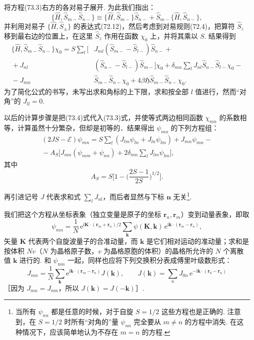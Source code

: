 将方程(73.3)右方的各对易子展开. 为此我们指出：
\begin{equation*}
\{\hat{H},\hat{S}_{m-}\hat{S}_{n-}\}\equiv
\{\hat{H},\hat{S}_{m-}\}\hat{S}_{n-}
+\hat{S}_{m-}\{\hat{H},\hat{S}_{n-}\},
\end{equation*}
并利用对易子 $\{\hat{H},\hat{S}_{\pm}\}$ 的表达式(72.12)，然后考虑到对易规则(72.4)，把算符 $\hat{S}_z$ 移到最右边的位置上，在这里 $\hat{S}_z$ 作用在函数 $\chi_0$ 上，并将其乘以 $S$. 结果得到
\begin{equation}
\begin{aligned}
\{\hat{H},\hat{S}_{m-}\hat{S}_{n-}\}\chi_0
=S\sum_l\bigl[&J_{ml}(\hat{S}_{m-}-\hat{S}_{l-})\hat{S}_{n-}+{}\\
{}+J_{nl}&(\hat{S}_{n-}-\hat{S}_{l-})\hat{S}_{m-}\bigr]\chi_0
+\delta_{mn}\sum_lJ_{nl}\hat{S}_{n-}\hat{S}_{l-}\chi_0-{}\\
{}-J_{mn}&\hat{S}_{m-}\hat{S}_{n-}\chi_0
+4\beta\mathfrak{H}\hat{S}_{m-}\hat{S}_{n-}\chi_0.
\end{aligned}
\end{equation}
为了简化公式的书写，未写出求和角标的上下限，求和按全部 $l$ 值进行，然而“对角”的 $J_{ll}=0$.

以后的计算步骤是把(73.4)式代入(73.3)式，并使等式两边相同函数 $\chi_{mn}$ 的系数相等，计算虽然十分繁杂，但却是初等的．结果得出 $\psi_{mn}$ 的下列方程组：
\begin{equation}
\begin{aligned}
(2JS-\mathcal{E})\psi_{mn}
=S\sum_l(J_{lm}\psi_{ln}+J_{ln}\psi_{lm})+J_{mn}\psi_{mn}-{}\\
{}-A_S\bigl[J_{mn}(\psi_{mm}+\psi_{nn})
+2\delta_{mn}\sum_lJ_{lm}\psi_{lm}\bigr],
\end{aligned}
\end{equation}
其中
\begin{equation*}
A_S=S\biggl[1-\biggl(\frac{2S-1}{2S}\biggr)^{\!1/2}\biggr].
\end{equation*}

再引进记号 $J$ 代表求和式 $\sum_lJ_{nl}$，而后者显然与下标 $\bm{n}$ 无关\footnote{当所有 $\psi_{nn}$ 都是任意的时候，对于自旋 $S=1/2$ 这些方程也是正确的. 注意到，在 $S=1/2$ 时所有“对角的”量 $\psi_{nn}$ 完全要从 $m\neq n$ 的方程中消失. 在这种情况下，应该简单地认为不存在 $m=n$ 的方程.}.

我们把这个方程从坐标表象（独立变量是原子的坐标 $\bm{r}_n,\bm{r}_m$）变到动量表象，即取
\begin{equation}
\psi_{mn}=\frac{1}{N}\,\mathrm{e}^{\mathrm{i}\bm{K}\cdot(\bm{r}_m+\bm{r}_n)/2}
\sum_{\bm{k}}\psi(\bm{K},\bm{k})\,\mathrm{e}^{\mathrm{i}\bm{k}\cdot(\bm{r}_m-\bm{r}_n)},
\end{equation}
矢量 $\bm{K}$ 代表两个自旋波量子的合准动量，而 $\bm{k}$ 是它们相对运动的准动量；求和是按体积 $Nv$（$N$ 为晶格原子数，$v$ 为晶格原胞的体积）的晶格所允许的 $N$ 个离散值 $\bm{k}$ 进行的. 和 $\psi_{mn}$ 一起，同样也应将下列交换积分表成傅里叶级数形式：
\begin{equation}
J_{mn}=\frac{1}{N}\sum_{\bm{k}}\mathrm{e}^{\mathrm{i}\bm{k}\cdot(\bm{r}_m-\bm{r}_n)}J(\bm{k}),
\qquad J(\bm{k})=\sum_nJ_{0n}\,\mathrm{e}^{-\mathrm{i}\bm{k}\cdot(\bm{r}_0-\bm{r}_n)}
\end{equation}
［因为 $J_{mn}=J_{nm}$，所以 $J(\bm{k})=J(-\bm{k})$］.

